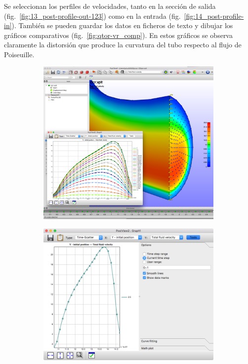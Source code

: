 Se seleccionan los perfiles de velocidades, tanto en la sección de salida (fig.~\ref{fig:13_post-profile-out-123}) como en la entrada (fig.~\ref{fig:14_post-profile-in}).
También se pueden guardar los datos en ficheros de texto y dibujar los gráficos comparativos (fig.~\ref{fig:qtor-vr_comp}).
En estos gráficos se observa claramente la distorsión que produce la curvatura del tubo respecto al flujo de Poiseuille.
\begin{figure}[!ht]
\centering
\begin{subfigure}[b]{0.48\textwidth}
\centering
\includegraphics[width=\linewidth]{figuras_4/13_post-profile-out-1.png}
\caption{}
\label{fig:13_post-profile-out-1}
\end{subfigure}
\hfil
\begin{subfigure}[b]{0.25\textwidth}
\includegraphics[width=\linewidth]{figuras_4/13_post-profile-out-2.png}

\end{subfigure}
\end{figure}

